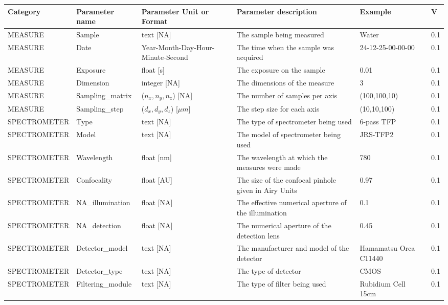 \documentclass[11pt]{article}
\begin{document}
\begin{tabular}{|p{3.2cm} p{3cm}||p{2cm}|p{3cm}|p{1.8cm}|p{0.5cm}|}
  \hline
  Category & Parameter name & Parameter Unit or Format & Parameter description & Example & V \\
  \hline
  MEASURE & Sample & text [NA] & The sample being measured & Water & 0.1 \\
  \hline
  MEASURE & Date & Year-Month-Day-Hour-Minute-Second & The time when the sample was acquired & 24-12-25-00-00-00 & 0.1\\
  \hline
  MEASURE & Exposure & float [s] & The exposure on the sample & 0.01 & 0.1 \\
  \hline
  MEASURE & Dimension & integer [NA] & The dimensions of the measure & 3 & 0.1\\
  \hline
  MEASURE & Sampling\_matrix & ($n_x,n_y,n_z$) [NA] & The number of samples per axis & (100,100,10) & 0.1\\
  \hline
  MEASURE & Sampling\_step & ($d_x,d_y,d_z$) [$\mu m$] & The step size for each axis & (10,10,100) & 0.1\\
  \hline
  \hline
  SPECTROMETER & Type & text [NA] & The type of spectrometer being used & 6-pass TFP & 0.1\\
  \hline
  SPECTROMETER & Model & text [NA] & The model of spectrometer being used & JRS-TFP2 & 0.1\\
  \hline
  SPECTROMETER & Wavelength & float [nm] & The wavelength at which the measures were made & 780 & 0.1\\
  \hline
  SPECTROMETER & Confocality & float [AU] & The size of the confocal pinhole given in Airy Units & 0.97 & 0.1\\
  \hline
  SPECTROMETER & NA\_illumination & float [NA] & The effective numerical aperture of the illumination & 0.1 & 0.1\\
  \hline
  SPECTROMETER & NA\_detection & float [NA] & The numerical aperture of the detection lens & 0.45 & 0.1\\
  \hline
  SPECTROMETER & Detector\_model & text [NA] & The manufacturer and model of the detector & Hamamatsu Orca C11440 & 0.1\\
  \hline
  SPECTROMETER & Detector\_type & text [NA] & The type of detector & CMOS & 0.1\\
  \hline
  SPECTROMETER & Filtering\_module & text [NA] & The type of filter being used & Rubidium Cell 15cm & 0.1\\
  \hline
\end{tabular}
\end{document}
